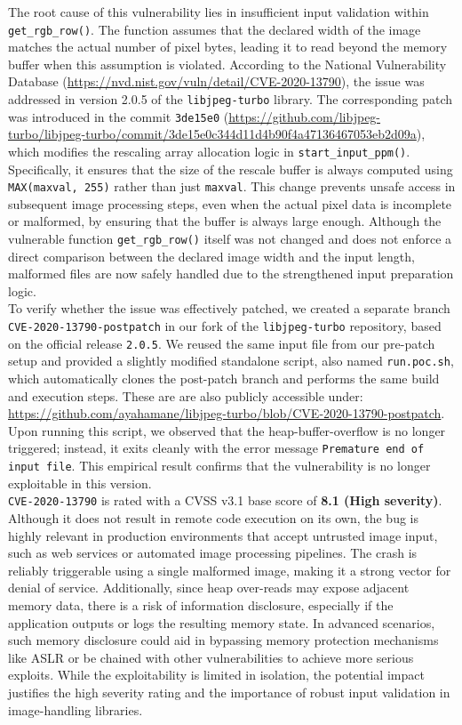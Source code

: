 \documentclass[12pt]{article}
\begin{document}
\noindent The root cause of this vulnerability lies in insufficient input validation within \texttt{get\_rgb\_row()}. The function assumes that the declared width of the image matches the actual number of pixel bytes, leading it to read beyond the memory buffer when this assumption is violated. According to the National Vulnerability Database (\url{https://nvd.nist.gov/vuln/detail/CVE-2020-13790}), the issue was addressed in version 2.0.5 of the \texttt{libjpeg-turbo} library. The corresponding patch was introduced in the commit \texttt{3de15e0} (\url{https://github.com/libjpeg-turbo/libjpeg-turbo/commit/3de15e0c344d11d4b90f4a47136467053eb2d09a}), which modifies the rescaling array allocation logic in \texttt{start\_input\_ppm()}. Specifically, it ensures that the size of the rescale buffer is always computed using \texttt{MAX(maxval, 255)} rather than just \texttt{maxval}. This change prevents unsafe access in subsequent image processing steps, even when the actual pixel data is incomplete or malformed, by ensuring that the buffer is always large enough. Although the vulnerable function \texttt{get\_rgb\_row()} itself was not changed and does not enforce a direct comparison between the declared image width and the input length, malformed files are now safely handled due to the strengthened input preparation logic.\\

\noindent To verify whether the issue was effectively patched, we created a separate branch \texttt{CVE-2020-13790-postpatch} in our fork of the \texttt{libjpeg-turbo} repository, based on the official release \texttt{2.0.5}. We reused the same input file from our pre-patch setup and provided a slightly modified standalone script, also named \texttt{run.poc.sh}, which automatically clones the post-patch branch and performs the same build and execution steps. These are are also publicly accessible under: \url{https://github.com/ayahamane/libjpeg-turbo/blob/CVE-2020-13790-postpatch}. Upon running this script, we observed that the heap-buffer-overflow is no longer triggered; instead, it exits cleanly with the error message \texttt{Premature end of input file}. This empirical result confirms that the vulnerability is no longer exploitable in this version.\\

\noindent \texttt{CVE-2020-13790} is rated with a CVSS v3.1 base score of \textbf{8.1 (High severity)}. Although it does not result in remote code execution on its own, the bug is highly relevant in production environments that accept untrusted image input, such as web services or automated image processing pipelines. The crash is reliably triggerable using a single malformed image, making it a strong vector for denial of service. Additionally, since heap over-reads may expose adjacent memory data, there is a risk of information disclosure, especially if the application outputs or logs the resulting memory state. In advanced scenarios, such memory disclosure could aid in bypassing memory protection mechanisms like ASLR or be chained with other vulnerabilities to achieve more serious exploits. While the exploitability is limited in isolation, the potential impact justifies the high severity rating and the importance of robust input validation in image-handling libraries.
\end{document}
